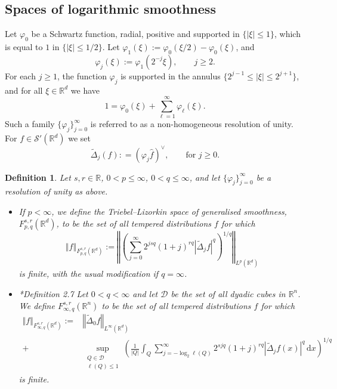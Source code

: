 \documentclass[a4paper, leqno, 10pt]{amsart}
\numberwithin{equation}{section}
\newtheorem{define}[thm]{Definition}
\newcommand{\dd}{\mathrm{d}}
\newcommand{\R}{\mathbb{R}}
\newcommand{\norm}[1]{\left\Vert#1\right\Vert}
\newcommand{\brkt}[1]{\left(#1\right)}
\newcommand{\abs}[1]{\left|#1\right|}
\begin{document}
\subsection{Spaces of logarithmic smoothness}\label{s_log_smooth}
Let $\varphi_0$ be a Schwartz function, radial, positive and supported in $\{ \abs{\xi}\leq 1 \}$, which is equal to $1$ in $\{ \abs{\xi}\leq 1/2 \}$.  Let $\varphi_1(\xi):=\varphi_0(\xi/2)-\varphi_0(\xi)$, and 
\[
\varphi_j(\xi):=\varphi_1(2^{-j}\xi), \qquad j\geq 2.
\]
For each $j\geq 1$, the function $\varphi_j$ is supported in the annulus $\{2^{j-1}\leq\abs{\xi}\leq 2^{j+1}\}$, and for all $\xi\in\R^d$ we have
%
\begin{equation}\label{PasQ}
1=\varphi_0(\xi)+\sum_{\ell=1}^\infty\varphi_\ell(\xi).
\end{equation}
Such a family $\{\varphi_j\}_{j=0}^\infty$ is referred to as a non-homogeneous resolution of unity. 
For $f \in \mathcal{S}' (\R^d)$ we set 
\[ 
\widetilde{\Delta}_j (f) : =\brkt{\varphi_j \widehat{f}}^\vee, \qquad \mbox{for $j\geq 0$.}
\]  

\begin{define}\label{GSTL}
Let $s,r\in\R$, $0<p\leq\infty$, $0<q\leq\infty$, and let $\lbrace\varphi_j\rbrace_{j=0}^\infty$ be a resolution of unity as above. 
\begin{itemize}
\item \cites{cae-mou,M} If $p<\infty$, we define the Triebel--Lizorkin space of generalised smoothness, $F_{p,q}^{s,r}(\R^d)$, to be the set of all tempered distributions $f$ for which
\[
\norm{f}_{F_{p,q}^{s,r}(\R^d)}:=\norm{\left(\sum_{j=0}^\infty 2^{jsq}\brkt{1+j}^{rq}\abs{\widetilde{\Delta}_jf}^q\right)^{1/q}}_{L^p(\R^d)}
\]
is finite, with the usual modification if $q=\infty$.
\item \cite{AR2}*{Definition 2.7} Let $0<q<\infty$ and let $\mathcal{D}$ be the set of all dyadic cubes in $\R^n$. We define $F_{\infty,q}^{s,r}(\R^n)$ to be the set of all tempered distributions $f$ for which
\begin{align*}
\norm{f}_{F_{\infty,q}^{s,r}(\R^d)} :=& \norm{\widetilde{\Delta}_0f}_{L^{\infty}(\R^d)}\\
+& \sup_{\substack{Q\in\mathcal{D} \\ \ell(Q)\leq 1}}\left(\frac{1}{\abs{Q}}\int_Q\sum_{j=-\log_2 \ell(Q)}^\infty 2^{sj q}\brkt{1+j}^{rq}\abs{\widetilde{\Delta}_jf(x)}^q \, \dd x\right)^{1/q}
\end{align*}
is finite.
\end{itemize}
\end{define}
\end{document}
